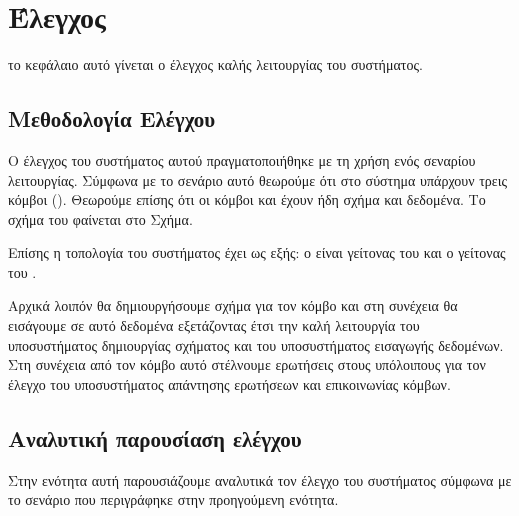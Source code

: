 \chapter{Έλεγχος}
το κεφάλαιο αυτό γίνεται ο έλεγχος καλής λειτουργίας του συστήματος.

\section{Μεθοδολογία Ελέγχου}
Ο έλεγχος του συστήματος αυτού πραγματοποιήθηκε με τη χρήση ενός
σεναρίου λειτουργίας. Σύμφωνα με το σενάριο αυτό θεωρούμε ότι στο
σύστημα υπάρχουν τρεις κόμβοι (). Θεωρούμε
επίσης ότι οι κόμβοι  και  έχουν ήδη σχήμα και
δεδομένα. Το σχήμα του  φαίνεται στο
Σχήμα.



Επίσης η τοπολογία του συστήματος έχει ως εξής: ο  είναι
γείτονας του  και ο  γείτονας του .

Αρχικά λοιπόν θα δημιουργήσουμε σχήμα για τον κόμβο  και
στη συνέχεια θα εισάγουμε σε αυτό δεδομένα εξετάζοντας έτσι την
καλή λειτουργία του υποσυστήματος δημιουργίας σχήματος και του
υποσυστήματος εισαγωγής δεδομένων. Στη συνέχεια από τον κόμβο αυτό
στέλνουμε ερωτήσεις στους υπόλοιπους για τον έλεγχο του
υποσυστήματος απάντησης ερωτήσεων και επικοινωνίας κόμβων.

\section{Αναλυτική παρουσίαση ελέγχου}
Στην ενότητα αυτή παρουσιάζουμε αναλυτικά τον έλεγχο του
συστήματος σύμφωνα με το σενάριο που περιγράφηκε στην προηγούμενη
ενότητα.